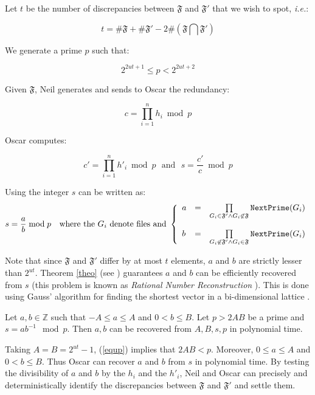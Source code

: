 \documentclass[11pt]{llncs}
\begin{document}
Let $t$ be the number of discrepancies between $\mathfrak{F}$ and $\mathfrak{F}'$ that we wish to spot, {\sl i.e.}:

$$t=\#\mathfrak{F}+\#\mathfrak{F}'-2 \#(\mathfrak{F} \bigcap \mathfrak{F}')$$

We generate a prime $p$ such that:

\begin{equation}
\label{equp}
2^{2ut+1} \leq p < 2^{2ut+2}
\end{equation}

Given $\mathfrak{F}$, Neil generates and sends to Oscar the redundancy:

$$
c=\prod_{i=1}^n h_i \bmod p
$$

Oscar computes:\smallskip

$$c'=\prod_{i=1}^n h'_i \bmod p{~~~\mbox{and}~~~}s=\frac{c'}{c} \bmod p$$

Using \cite{vallee} the integer $s$ can be written as:
$$s=\frac{a}{b} \bmod p{~~~\mbox{where the~}G_i\mbox{~denote files and~}}
\left\{
\begin{array}{lcr}
a & =&  \prod\limits_{G_i \in \mathfrak{F}'\wedge G_i \not\in\mathfrak{F}} \mbox{{\tt NextPrime}}(G_i) \\
\\
b & = & \prod\limits_{G_i \not\in\mathfrak{F}' \wedge G_i \in\mathfrak{F}} \mbox{{\tt NextPrime}}(G_i)
\end{array}
\right.
$$

Note that since $\mathfrak{F}$ and $\mathfrak{F}'$ differ by at most $t$ elements, $a$ and $b$ are strictly lesser than $2^{ut}$. Theorem \ref{theo} (see \cite{cryptorational}) guarantees $a$ and $b$ can be efficiently recovered from $s$ (this problem is known as {\sl Rational Number Reconstruction} \cite{pan2004rational,wang2003acceleration}). This is done using Gauss' algorithm for finding the shortest vector in a bi-dimensional lattice \cite{vallee}.

\begin{theorem}
\label{theo}
Let $a,b \in {\mathbb Z}$ such that $-A \leq a \leq A$ and $0<b \leq B$. Let $p>2AB$ be a prime and $s=a b^{-1} \mod p$.
Then $a,b$ can be recovered from $A,B,s,p$ in polynomial time.
\end{theorem}

Taking $A=B=2^{ut}-1$, (\ref{equp}) implies that $2AB<p$. Moreover, $0 \leq a \leq A$ and $0 <b \leq B$. Thus Oscar can
recover $a$ and $b$ from $s$ in polynomial time. By testing the divisibility of $a$ and $b$ by the $h_i$ and the $h'_i$, Neil and Oscar can
precisely and deterministically identify the discrepancies between $\mathfrak{F}$ and $\mathfrak{F}'$ and settle them.\smallskip
\end{document}

